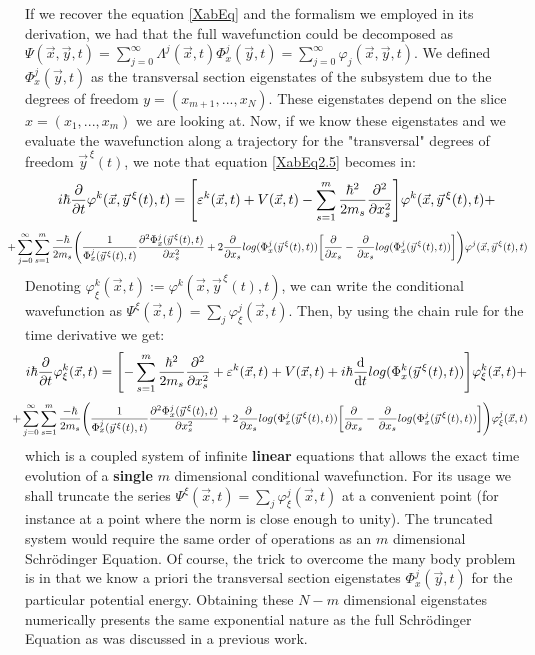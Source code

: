 \documentclass[11pt, a4paper]{article} %
\begin{document}
If we recover the equation \eqref{XabEq} and the formalism we employed in its derivation, we had that the full wavefunction could be decomposed as $\Psi(\vec{x},\vec{y},t)=\sum_{j=0}^\infty\Lambda^j(\vec{x},t)\Phi^j_x(\vec{y},t)=\sum_{j=0}^\infty \varphi_j(\vec{x},\vec{y},t)$. We defined $\Phi^j_x(\vec{y},t)$ as the transversal section eigenstates of the subsystem due to the degrees of freedom $y=(x_{m+1},...,x_N)$. These eigenstates depend on the slice $x=(x_1,...,x_m)$ we are looking at. Now, if we know these eigenstates and we evaluate the wavefunction along a trajectory for the "transversal" degrees of freedom $\vec{y}^{\, \xi}(t)$, we note that equation \eqref{XabEq2.5} becomes in:
\begin{equation}
 i\hbar\pdv{}{t}\varphi^k(\vec{x},\vec{y}^{\, \xi}(t),t)=\qty[ \varepsilon^k(\vec{x},t)+V(\vec{x},t)  -\sum_{s=1}^m\frac{\hbar^2}{2m_s}\pdv[2]{}{x_s} ]\varphi^k(\vec{x},\vec{y}^{\, \xi}(t),t)+
\end{equation}
$$
\hspace{-0.6cm}+\sum_{j=0}^\infty\sum_{s=1}^m \frac{-\hbar}{2m_s}\qty( \frac{1}{\Phi^j_x(\vec{y}^{\, \xi}(t),t)}\pdv[2]{\Phi^j_x(\vec{y}^{\, \xi}(t),t)}{x_s}+2\pdv{}{x_s}log(\Phi^j_x(\vec{y}^{\, \xi}(t),t))\qty[\pdv{}{x_s}-\pdv{}{x_s}log(\Phi^j_x(\vec{y}^{\, \xi}(t),t))] )\varphi^j(\vec{x},\vec{y}^{\, \xi}(t),t)
$$
Denoting $\varphi^k_\xi(\vec{x},t):=\varphi^k(\vec{x},\vec{y}^{\, \xi}(t),t)$, we can write the conditional wavefunction as $\Psi^\xi(\vec{x},t)=\sum_j \varphi^j_\xi(\vec{x},t)$. Then, by using the chain rule for the time derivative we get:
\begin{equation}\label{XabEq3}
 i\hbar\pdv{}{t}\varphi^k_\xi(\vec{x},t)=\qty[-\sum_{s=1}^m\frac{\hbar^2}{2m_s}\pdv[2]{}{x_s}+ \varepsilon^k(\vec{x},t)+V(\vec{x},t)   +i\hbar \dv{}{t}log(\Phi^k_x(\vec{y}^{\, \xi}(t),t))]\varphi^k_\xi(\vec{x},t)+
\end{equation}
$$
\hspace{-0.4cm}+\sum_{j=0}^\infty\sum_{s=1}^m \frac{-\hbar}{2m_s}\qty( \frac{1}{\Phi^j_x(\vec{y}^{\, \xi}(t),t)}\pdv[2]{\Phi^j_x(\vec{y}^{\, \xi}(t),t)}{x_s}+2\pdv{}{x_s}log(\Phi^j_x(\vec{y}^{\, \xi}(t),t))\qty[\pdv{}{x_s}-\pdv{}{x_s}log(\Phi^j_x(\vec{y}^{\, \xi}(t),t))] )\varphi^j_\xi(\vec{x},t)
$$
which is a coupled system of infinite {\bf linear} equations that allows the exact time evolution of a {\bf single} $m$ dimensional conditional wavefunction. For its usage we shall truncate the series $\Psi^\xi(\vec{x},t)=\sum_j \varphi^j_\xi(\vec{x},t)$ at a convenient point (for instance at a point where the norm is close enough to unity). The truncated system would require the same order of operations as an $m$ dimensional Schrödinger Equation. Of course, the trick to overcome the many body problem is in that we know a priori the transversal section eigenstates $\Phi^j_x(\vec{y},t)$ for the particular potential energy. Obtaining these $N-m$ dimensional eigenstates numerically presents the same exponential nature as the full Schrödinger Equation as was discussed in a previous work.
\end{document}
